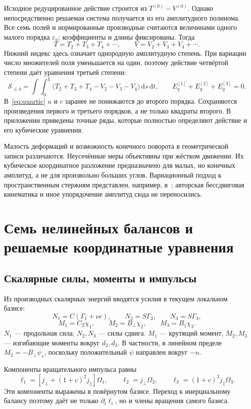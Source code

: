 \documentclass[11pt,a4paper]{article}
\newcommand{\dd}{\,\mathrm d}
\begin{document}
Исходное редуцированное действие строится из $T^{(0)}-V^{(0)}$. Однако непосредственно решаемая система получается из его амплитудного полинома. Все семь полей и нормированные производные считаются величинами одного малого порядка $\varepsilon_a$; коэффициенты и длины фиксированы. Тогда
\[
T=T_2+T_3+T_4+\cdots,\qquad
V=V_2+V_3+V_4+\cdots.
\]
Нижний индекс здесь означает однородную амплитудную степень. При вариации число множителей поля уменьшается на один, поэтому действие четвёртой степени даёт уравнения третьей степени:
\begin{equation}
\mathcal S_{\leq4}=\int\!\int_0^L
\bigl(T_2+T_3+T_4-V_2-V_3-V_4\bigr)\dd s\dd t,
\qquad E_q^{[1]}+E_q^{[2]}+E_q^{[3]}=0.
\label{eq:quartic}
\end{equation}
В~\eqref{eq:quartic} $u$ и $c$ заранее не понижаются до второго порядка. Сохраняются произведения первого и третьего порядков, а не только квадраты второго. В приложении приведены точные ряды, которые полностью определяют действие и его кубические уравнения.

Малость деформаций и возможность конечного поворота в геометрической записи различаются. Неусечённые меры объективны при жёстком движении. Их кубическое координатное разложение предназначено для малых, но конечных амплитуд, а не для произвольно больших углов. Вариационный подход к пространственным стержням представлен, например, в~\cite{crespo}; авторская бессдвиговая кинематика и иное упорядочение амплитуд сюда не переносились.

\section{Семь нелинейных балансов и решаемые координатные уравнения}
\subsection{Скалярные силы, моменты и импульсы}
Из производных скалярных энергий вводятся усилия в текущем локальном базисе:
\[
N_1=C(\Gamma_1+\nu c),\qquad N_2=S\Gamma_2,\qquad N_3=S\Gamma_3,
\]
\[
M_1=C_T\chi_1,\qquad M_2=B_\perp\chi_2,\qquad M_3=B_\parallel\chi_3.
\]
$N_1$ --- продольная сила; $N_2,N_3$ --- силы сдвига. $M_1$ --- крутящий момент, $M_2,M_3$ --- изгибающие моменты вокруг $d_2,d_3$. В частности, в линейном пределе $M_2=-B_\perp\psi_s$, поскольку положительный $\psi$ направлен вокруг $-n$.

Компоненты вращательного импульса равны
\[
\ell_1=[j_\perp+(1+c)^2j_\parallel]\Omega_1,
\qquad \ell_2=j_\perp\Omega_2,
\qquad \ell_3=(1+c)^2j_\parallel\Omega_3.
\]
Эти компоненты выражены в повёрнутом базисе. Переход к инерциальному балансу поэтому даёт не только $\partial_t\ell_i$, но и члены вращения самого базиса.
\end{document}
